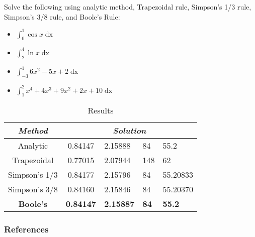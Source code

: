 \documentclass{beamer}
\begin{document}
\begin{frame}
  Solve the following using analytic method, Trapezoidal rule, Simpson's 1/3 rule, Simpson's 3/8 rule, and \alert{Boole's Rule}:
  \begin{itemize}
    \item $\int_0^1 \cos{x} \mathop{dx}$
    \item $\int_2^4 \ln{x} \mathop{dx}$
    \item $\int_{-3}^1 6x^2 - 5x + 2 \mathop{dx}$
    \item $\int_{1}^2 x^4 +4x^3 + 9x^2 + 2x + 10 \mathop{dx}$
  \end{itemize}
\end{frame}

\begin{frame}
\begin{table}[]
\centering
\caption{Results}
\label{my-label}
\begin{tabular}{|c|c|l|l|l|}
\hline
\textit{\textbf{Method}} & \multicolumn{4}{c|}{\textit{\textbf{Solution}}}                   \\ \hline
Analytic                 & 0.84147          & 2.15888          & 84          & 55.2          \\ \hline
Trapezoidal              & 0.77015          & 2.07944          & 148         & 62            \\ \hline
Simpson's 1/3            & 0.84177          & 2.15796          & 84          & 55.20833      \\ \hline
Simpson's 3/8            & 0.84160          & 2.15846          & 84          & 55.20370      \\ \hline
\textbf{Boole's}         & \textbf{0.84147} & \textbf{2.15887} & \textbf{84} & \textbf{55.2} \\ \hline
\end{tabular}
\end{table}
\end{frame}

\begin{frame}[t,allowframebreaks]
  \frametitle{References}
  \printbibliography
\end{frame}
\end{document}
